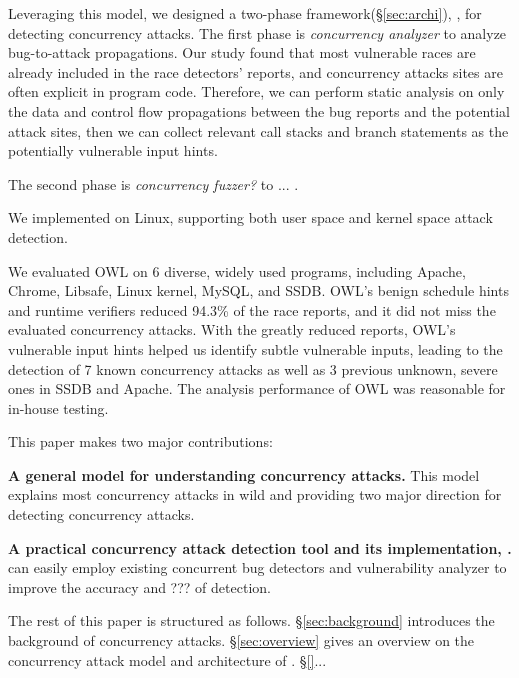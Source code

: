 Leveraging this model, we designed a two-phase framework(\S\ref{sec:archi}), \xxx, for detecting concurrency attacks. 
The first phase is \emph{concurrency analyzer} to analyze bug-to-attack propagations. 
Our study found that most vulnerable races are already included in the race detectors’ reports, 
and concurrency attacks sites are often explicit in program code.
Therefore, we can perform static analysis
on only the data and control flow propagations between the
bug reports and the potential attack sites, then we can collect
relevant call stacks and branch statements as the potentially
vulnerable input hints.

The second phase is \emph{concurrency fuzzer?} to ... .

We implemented \xxx on Linux, supporting both user space and kernel space attack detection. 



We evaluated OWL on 6 diverse, widely used programs, including Apache, Chrome, Libsafe, Linux kernel, MySQL,
and SSDB. OWL’s benign schedule hints and runtime verifiers reduced 94.3\% of the race reports, 
and it did not miss the evaluated concurrency attacks. With the greatly reduced reports,
OWL’s vulnerable input hints helped us identify subtle
vulnerable inputs, leading to the detection of 7 known concurrency
attacks as well as 3 previous unknown, severe ones
in SSDB and Apache. The analysis performance of OWL was
reasonable for in-house testing.


This paper makes two major contributions:

\begin{tightenum}
\item \textbf{A general model for understanding concurrency attacks.} 
This model explains most concurrency attacks in wild and 
providing two major direction for detecting concurrency attacks. 
	
\item \textbf{A practical concurrency attack detection tool and its implementation, \xxx.} 
\xxx can easily employ existing concurrent bug detectors and vulnerability analyzer 
to improve the accuracy and ??? of detection.
	
\end{tightenum}

 

The rest of this paper is structured as follows. 
\S\ref{sec:background} introduces the background of concurrency attacks.
\S\ref{sec:overview} gives an overview on the concurrency attack model and architecture of \xxx.
\S\ref{}...





